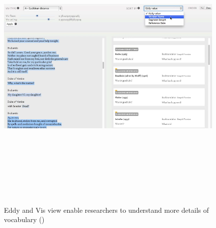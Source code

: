 \begin{figure}[h] 
	\centering	
	\includegraphics[width=16cm, height=14cm]{Figs/Eddy-Viv-View}\\[1ex]
	\caption{Eddy and Vis view enable researchers to understand more details of vocabulary (\cite{Cheesman2012})}
	\label{fig:eddyVivView}
\end{figure} 



